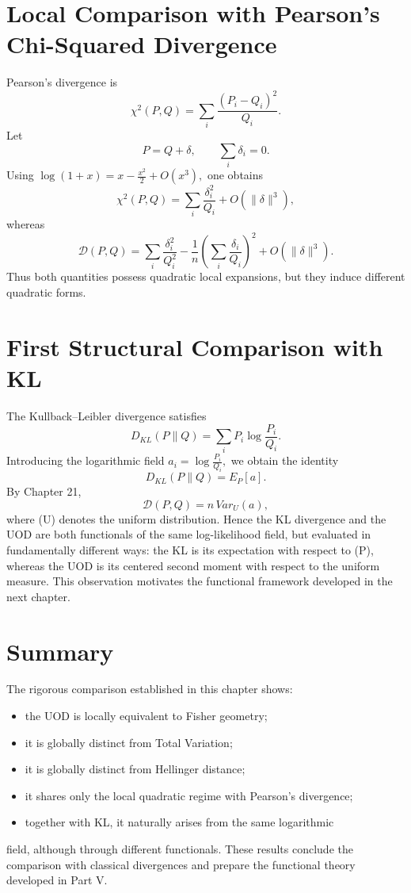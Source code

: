\section{Local Comparison with Pearson's Chi-Squared Divergence}
Pearson's divergence is
\[ \chi^{2}(P,Q) = \sum_{i}
\frac{(P_i-Q_i)^2}{Q_i}. \]
Let
\[ P=Q+\delta, \qquad
\sum_{i}\delta_{i}=0. \]
Using
$\log(1+x)=x-\frac{x^2}{2}+O(x^{3}),$
one obtains
\[ \chi^{2}(P,Q) = \sum_{i}
\frac{\delta_i^2}{Q_i} + O(\|\delta\|^{3}), \]
whereas
\[ \mathcal{D}(P,Q) = \sum_{i}
\frac{\delta_i^2}{Q_i^2} - \frac1n \left(
\sum_{i}\frac{\delta_i}{Q_i} \right)^{2} +
O(\|\delta\|^{3}). \]
Thus both quantities possess quadratic local expansions, but they induce
different quadratic forms.
\section{First Structural Comparison with KL}
The Kullback--Leibler divergence satisfies
\[ D_{KL}(P\|Q) = \sum_{i} P_i
\log\frac{P_i}{Q_i}. \]
Introducing the logarithmic field
$a_i=\log\frac{P_i}{Q_i},$
we obtain the identity
\[ \boxed{
D_{KL}(P\|Q)=E_P[a].
} \]
By Chapter 21,
\[ \boxed{
\mathcal{D}(P,Q)
=
n\,Var_U(a),
} \]
where (U) denotes the uniform distribution.
Hence the KL divergence and the UOD are both functionals of the same
log-likelihood field, but evaluated in fundamentally different ways: the
KL is its expectation with respect to (P), whereas the UOD is its
centered second moment with respect to the uniform measure.
This observation motivates the functional framework developed in the
next chapter.
\section{Summary}
The rigorous comparison established in this chapter shows:
\begin{itemize}
  \item the UOD is locally equivalent to Fisher geometry;
  \item it is globally distinct from Total Variation;
  \item it is globally distinct from Hellinger distance;
  \item it shares only the local quadratic regime with Pearson's divergence;
  \item together with KL, it naturally arises from the same logarithmic
\end{itemize}
    field, although through different functionals.
These results conclude the comparison with classical divergences and
prepare the functional theory developed in Part V.
